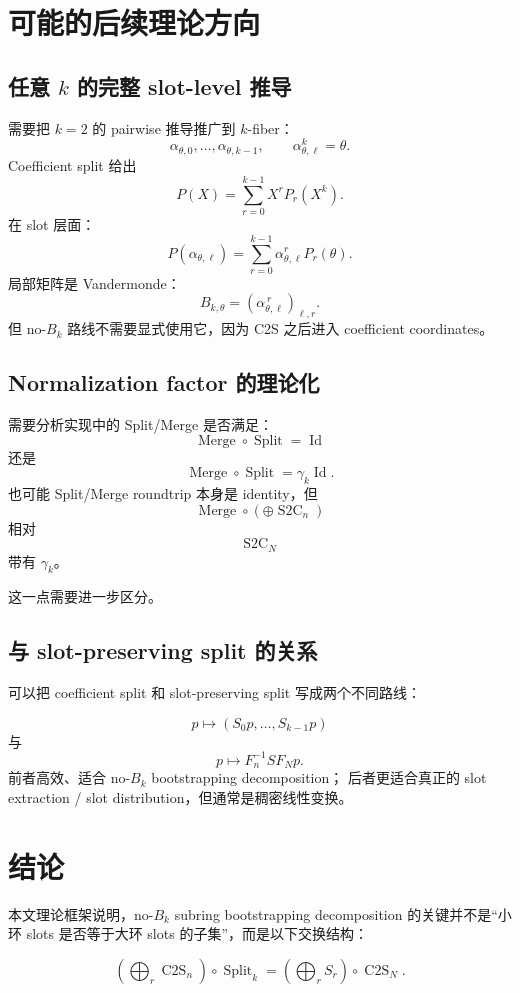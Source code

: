 \documentclass[UTF8,11pt]{ctexart}
\theoremstyle{definition}
\newcommand{\CtwoS}{\operatorname{C2S}}
\newcommand{\StwoC}{\operatorname{S2C}}
\newcommand{\Split}{\operatorname{Split}}
\newcommand{\Merge}{\operatorname{Merge}}
\newcommand{\Id}{\operatorname{Id}}
\begin{document}
\section{可能的后续理论方向}

\subsection{任意 \(k\) 的完整 slot-level 推导}

需要把 \(k=2\) 的 pairwise 推导推广到 \(k\)-fiber：
\[
\alpha_{\theta,0},\ldots,\alpha_{\theta,k-1},
\qquad
\alpha_{\theta,\ell}^k=\theta.
\]
Coefficient split 给出
\[
P(X)=\sum_{r=0}^{k-1}X^rP_r(X^k).
\]
在 slot 层面：
\[
P(\alpha_{\theta,\ell})
=
\sum_{r=0}^{k-1}
\alpha_{\theta,\ell}^rP_r(\theta).
\]
局部矩阵是 Vandermonde：
\[
B_{k,\theta}
=
\left(\alpha_{\theta,\ell}^{\,r}\right)_{\ell,r}.
\]
但 no-\(B_k\) 路线不需要显式使用它，因为 C2S 之后进入 coefficient coordinates。

\subsection{Normalization factor 的理论化}

需要分析实现中的 Split/Merge 是否满足：
\[
\Merge\circ\Split=\Id
\]
还是
\[
\Merge\circ\Split=\gamma_k\Id.
\]
也可能 Split/Merge roundtrip 本身是 identity，但
\[
\Merge\circ(\oplus \StwoC_n)
\]
相对
\[
\StwoC_N
\]
带有 \(\gamma_k\)。

这一点需要进一步区分。

\subsection{与 slot-preserving split 的关系}

可以把 coefficient split 和 slot-preserving split 写成两个不同路线：

\[
p\mapsto(S_0p,\ldots,S_{k-1}p)
\]
与
\[
p\mapsto F_n^{-1}SF_Np.
\]
前者高效、适合 no-\(B_k\) bootstrapping decomposition；
后者更适合真正的 slot extraction / slot distribution，但通常是稠密线性变换。

\section{结论}

本文理论框架说明，no-\(B_k\) subring bootstrapping decomposition 的关键并不是“小环 slots 是否等于大环 slots 的子集”，而是以下交换结构：

\[
\boxed{
\left(\bigoplus_r\CtwoS_n\right)\circ\Split_k
=
\left(\bigoplus_rS_r\right)\circ\CtwoS_N.
}
\]
\end{document}
